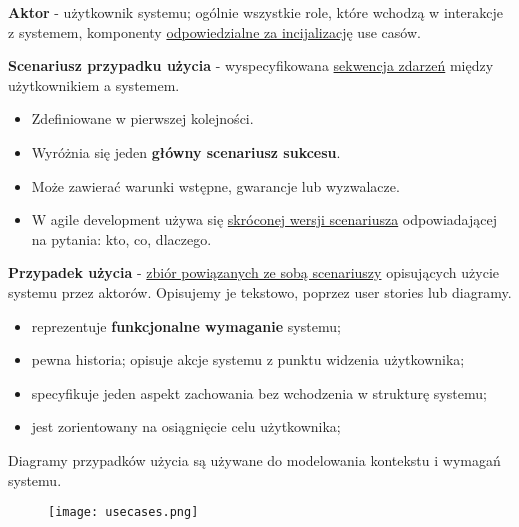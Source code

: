 \documentclass[../main.tex]{subfiles}
\begin{document}
    \textbf{Aktor} - użytkownik systemu; ogólnie wszystkie role, które wchodzą w interakcje z systemem, komponenty \underline{odpowiedzialne
    za incijalizację} use casów.

    \textbf{Scenariusz przypadku użycia} - wyspecyfikowana \underline{sekwencja zdarzeń} między użytkownikiem a systemem.
    \begin{itemize}
        \item Zdefiniowane w pierwszej kolejności.
        \item Wyróżnia się jeden \textbf{główny scenariusz sukcesu}.
        \item Może zawierać warunki wstępne, gwarancje lub wyzwalacze.
        \item W agile development używa się \underline{skróconej wersji scenariusza} odpowiadającej
        na pytania: kto, co, dlaczego.
    \end{itemize}

    \textbf{Przypadek użycia} - \underline{zbiór powiązanych ze sobą scenariuszy} opisujących użycie systemu przez aktorów.
    Opisujemy je tekstowo, poprzez user stories lub diagramy.
    \begin{itemize}
        \item reprezentuje \textbf{funkcjonalne wymaganie} systemu;
        \item pewna historia; opisuje akcje systemu z punktu widzenia użytkownika;
        \item specyfikuje jeden aspekt zachowania bez wchodzenia w strukturę systemu;
        \item jest zorientowany na osiągnięcie celu użytkownika;
    \end{itemize}
    Diagramy przypadków użycia są używane do modelowania kontekstu i wymagań systemu.

    \begin{figure}[H]
        \texttt{[image: usecases.png]}
    \end{figure}
\end{document}
